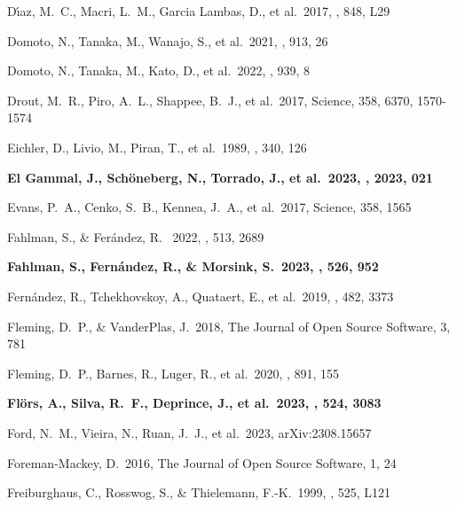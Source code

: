 \documentclass[twocolumn,twocolappendix]{aastex63}
\begin{document}
{{\begin{thebibliography}{}
 D{\'\i}az, M.~C., Macri, L.~M., Garcia Lambas, D., et al.\ 2017, \apjl, 848, L29


 Domoto, N., Tanaka, M., Wanajo, S., et al.\ 2021, \apj, 913, 26


 Domoto, N., Tanaka, M., Kato, D., et al.\ 2022, \apj, 939, 8


 Drout, M.~R., Piro, A.~L., Shappee, B.~J., et al.\ 2017, Science, 358, 6370, 1570-1574


 Eichler, D., Livio, M., Piran, T., et al.\ 1989, \nat, 340, 126


 \textbf{El Gammal, J., Sch{\"o}neberg, N., Torrado, J., et al.\ 2023, \jcap, 2023, 021}


 Evans, P.~A., Cenko, S.~B., Kennea, J.~A., et al.\ 2017, Science, 358, 1565


 Fahlman, S., \& Fer\'andez, R. \ 2022, \mnras, 513, 2689


 \textbf{Fahlman, S., Fern{\'a}ndez, R., \& Morsink, S.\ 2023, \mnras, 526, 952}


 Fern{\'a}ndez, R., Tchekhovskoy, A., Quataert, E., et al.\ 2019, \mnras, 482, 3373


 Fleming, D.~P., \& VanderPlas, J.\ 2018, The Journal of Open Source Software, 3, 781


 Fleming, D.~P., Barnes, R., Luger, R., et al.\ 2020, \apj, 891, 155


 \textbf{Fl{\"o}rs, A., Silva, R.~F., Deprince, J., et al.\ 2023, \mnras, 524, 3083}


 Ford, N.~M., Vieira, N., Ruan, J.~J., et al.\ 2023, arXiv:2308.15657


 Foreman-Mackey, D.\ 2016, The Journal of Open Source Software, 1, 24

 
 Freiburghaus, C., Rosswog, S., \& Thielemann, F.-K.\ 1999, \apjl, 525, L121



\end{thebibliography}}}
\end{document}
